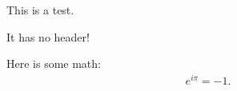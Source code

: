 This is a test.

It has no header!

Here is some math:
\begin{align}
    e^{i\pi} = -1 .
\end{align}

